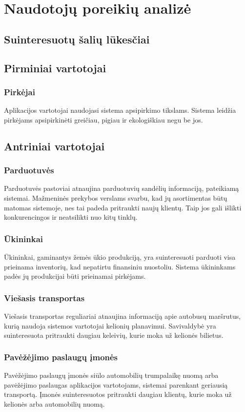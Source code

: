 \documentclass{article}
\begin{document}
\section{Naudotojų poreikių analizė}
\subsection{Suinteresuotų šalių lūkesčiai}
\subsection*{Pirminiai vartotojai}
\subsubsection*{Pirkėjai}
	Aplikacijos vartotojai naudojasi sistema apsipirkimo tikslams. Sistema leidžia pirkėjams apsipirkinėti greičiau, pigiau ir ekologiškiau negu be jos.
\subsection*{Antriniai vartotojai}
\subsubsection*{Parduotuvės}
	Parduotuvės pastoviai atnaujina parduotuvių sandėlių informaciją, pateikiamą sistemai. Mažmeninės prekybos verslams svarbu, kad jų asortimentas būtų matomas sistemoje, nes tai padeda pritraukti naujų klientų. Taip jos gali išlikti konkurencingos ir neatsilikti nuo kitų tinklų.
\subsubsection*{Ūkininkai}
	Ūkininkai, gaminantys žemės ūkio produkciją, yra suinteresuoti parduoti visa prieinama inventorių, kad nepatirtu finansiniu nuostoliu. Sistema ūkininkams padės jų produkcijai būti prieinamai pirkėjams.
\subsubsection*{Viešasis transportas}
	Viešasis transportas reguliariai atnaujina informaciją apie autobusų maršrutus, kurią naudoja sistemos vartotojai kelionių planavimui. Savivaldybė yra suinteresuota pritraukti daugiau keleivių, kurie moka už kelionės bilietus.
\subsubsection*{Pavėžėjimo paslaugų įmonės}
	Pavėžėjimo paslaugų įmonės siūlo automobilių trumpalaikę nuomą arba pavėžėjimo paslaugas aplikacijos vartotojams, sistemai parenkant geriausią transportą. Įmonės suinteresuotos pritraukti daugiau klientų, kurie moka už kelionės arba automobilių nuomą.
\end{document}
